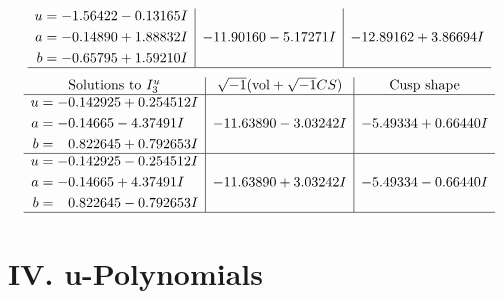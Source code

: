 \documentclass[1p]{elsarticle_modified}
\theoremstyle{definition}
\newcommand{\I}{\sqrt{-1}}
\begin{document}
$$\begin{array}{c|c|c}
\begin{aligned}
u &= -1.56422 - 0.13165 I \\
a &= -0.14890 + 1.88832 I \\
b &= -0.65795 + 1.59210 I\end{aligned}
 & -11.90160 - 5.17271 I & -12.89162 + 3.86694 I\\
 \hline 
 \end{array}$$\newpage$$\begin{array}{c|c|c}  
\text{Solutions to }I^u_{3}& \I (\text{vol} + \sqrt{-1}CS) & \text{Cusp shape}\\
 \hline 
\begin{aligned}
u &= -0.142925 + 0.254512 I \\
a &= -0.14665 - 4.37491 I \\
b &= \phantom{-}0.822645 + 0.792653 I\end{aligned}
 & -11.63890 - 3.03242 I & -5.49334 + 0.66440 I \\ \hline\begin{aligned}
u &= -0.142925 - 0.254512 I \\
a &= -0.14665 + 4.37491 I \\
b &= \phantom{-}0.822645 - 0.792653 I\end{aligned}
 & -11.63890 + 3.03242 I & -5.49334 - 0.66440 I\\
 \hline 
 \end{array}$$\newpage
\newpage\renewcommand{\arraystretch}{1}
\centering \section*{ IV. u-Polynomials}
\end{document}
